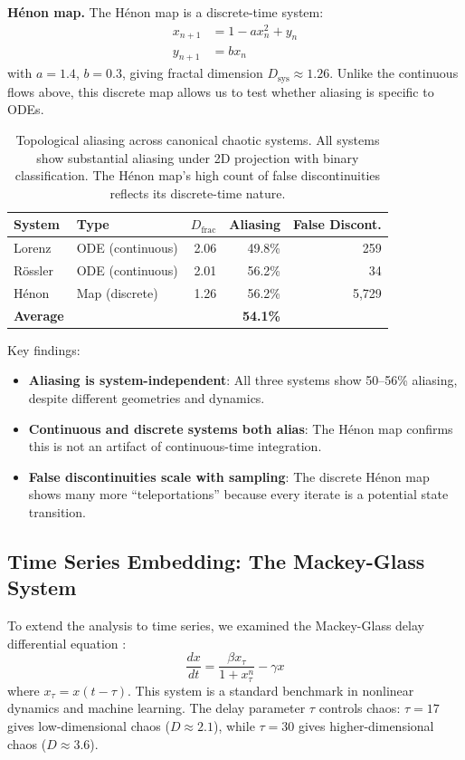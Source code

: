 \documentclass[12pt]{article}
\begin{document}
\textbf{Hénon map.} The Hénon map \cite{henon1976} is a discrete-time system:
\begin{align}
x_{n+1} &= 1 - ax_n^2 + y_n \\
y_{n+1} &= bx_n
\end{align}
with $a = 1.4$, $b = 0.3$, giving fractal dimension $D_{\text{sys}} \approx 1.26$. Unlike the continuous flows above, this discrete map allows us to test whether aliasing is specific to ODEs.

\begin{table}[h]
\centering
\begin{tabular}{@{}llrrr@{}}
\toprule
\textbf{System} & \textbf{Type} & \textbf{$D_{\text{frac}}$} & \textbf{Aliasing} & \textbf{False Discont.} \\
\midrule
Lorenz & ODE (continuous) & 2.06 & 49.8\% & 259 \\
Rössler & ODE (continuous) & 2.01 & 56.2\% & 34 \\
Hénon & Map (discrete) & 1.26 & 56.2\% & 5,729 \\
\midrule
\textbf{Average} & & & \textbf{54.1\%} & \\
\bottomrule
\end{tabular}
\caption{Topological aliasing across canonical chaotic systems. All systems show substantial aliasing under 2D projection with binary classification. The Hénon map's high count of false discontinuities reflects its discrete-time nature.}
\label{tab:chaotic}
\end{table}

Key findings:
\begin{itemize}
    \item \textbf{Aliasing is system-independent}: All three systems show 50--56\% aliasing, despite different geometries and dynamics.
    \item \textbf{Continuous and discrete systems both alias}: The Hénon map confirms this is not an artifact of continuous-time integration.
    \item \textbf{False discontinuities scale with sampling}: The discrete Hénon map shows many more ``teleportations'' because every iterate is a potential state transition.
\end{itemize}

\subsection{Time Series Embedding: The Mackey-Glass System}

To extend the analysis to time series, we examined the Mackey-Glass delay differential equation \cite{mackey1977}:
\begin{equation}
\frac{dx}{dt} = \frac{\beta x_\tau}{1 + x_\tau^n} - \gamma x
\end{equation}
where $x_\tau = x(t - \tau)$. This system is a standard benchmark in nonlinear dynamics and machine learning. The delay parameter $\tau$ controls chaos: $\tau = 17$ gives low-dimensional chaos ($D \approx 2.1$), while $\tau = 30$ gives higher-dimensional chaos ($D \approx 3.6$).
\end{document}
